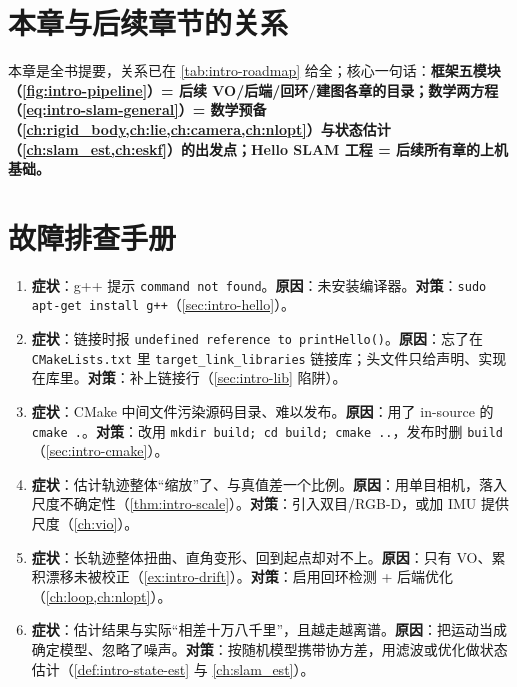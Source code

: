 \section*{本章与后续章节的关系}
本章是全书提要，关系已在 \cref{tab:intro-roadmap} 给全；核心一句话：\textbf{框架五模块（\cref{fig:intro-pipeline}）= 后续 VO/后端/回环/建图各章的目录；数学两方程（\cref{eq:intro-slam-general}）= 数学预备（\cref{ch:rigid_body,ch:lie,ch:camera,ch:nlopt}）与状态估计（\cref{ch:slam_est,ch:eskf}）的出发点；Hello SLAM 工程 = 后续所有章的上机基础。}

\section*{故障排查手册}
\begin{enumerate}
  \item \textbf{症状}：g++ 提示 \texttt{command not found}。\textbf{原因}：未安装编译器。\textbf{对策}：\texttt{sudo apt-get install g++}（\cref{sec:intro-hello}）。
  \item \textbf{症状}：链接时报 \texttt{undefined reference to printHello()}。\textbf{原因}：忘了在 \texttt{CMakeLists.txt} 里 \texttt{target\_link\_libraries} 链接库；头文件只给声明、实现在库里。\textbf{对策}：补上链接行（\cref{sec:intro-lib} 陷阱）。
  \item \textbf{症状}：CMake 中间文件污染源码目录、难以发布。\textbf{原因}：用了 in-source 的 \texttt{cmake .}。\textbf{对策}：改用 \texttt{mkdir build; cd build; cmake ..}，发布时删 \texttt{build}（\cref{sec:intro-cmake}）。
  \item \textbf{症状}：估计轨迹整体“缩放”了、与真值差一个比例。\textbf{原因}：用单目相机，落入尺度不确定性（\cref{thm:intro-scale}）。\textbf{对策}：引入双目/RGB-D，或加 IMU 提供尺度（\cref{ch:vio}）。
  \item \textbf{症状}：长轨迹整体扭曲、直角变形、回到起点却对不上。\textbf{原因}：只有 VO、累积漂移未被校正（\cref{ex:intro-drift}）。\textbf{对策}：启用回环检测 + 后端优化（\cref{ch:loop,ch:nlopt}）。
  \item \textbf{症状}：估计结果与实际“相差十万八千里”，且越走越离谱。\textbf{原因}：把运动当成确定模型、忽略了噪声。\textbf{对策}：按随机模型携带协方差，用滤波或优化做状态估计（\cref{def:intro-state-est} 与 \cref{ch:slam_est}）。
\end{enumerate}
